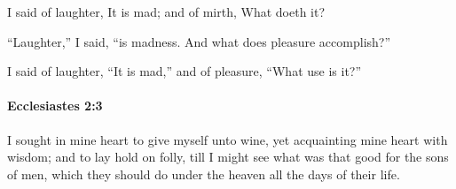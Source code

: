 			\begin{versebox}
					\item[BHS] 
					\item[LXX] 
					\item[ASV] I said of laughter, It is mad; and of mirth, What doeth it?
					\item[NIV] “Laughter,” I said, “is madness. And what does pleasure accomplish?”
					\item[NRSV] I said of laughter, “It is mad,” and of pleasure, “What use is it?”
			\end{versebox}

		\paragraph{Ecclesiastes 2:3} %
			\label{ECCLESIASTES-2-3}

			I sought in mine heart to give myself unto wine, yet acquainting mine heart with wisdom; and to lay hold on folly, till I might see what was that good for the sons of men, which they should do under the heaven all the days of their life.

